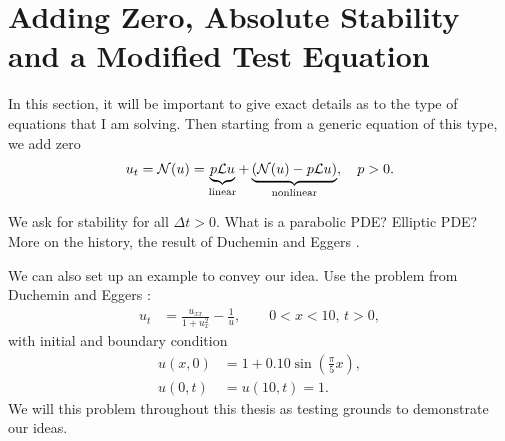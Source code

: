 \chapter{Adding Zero, Absolute Stability and a Modified Test Equation}
In this section, it will be important to give exact details as to the type of equations that I am solving. Then starting from a generic equation of this type, we add zero
\begin{align}
        u_t = \mathcal{N}(u)
= \underbrace{p\mathcal{L} u}_\text{linear} +\underbrace{ (\mathcal{N}(u) - p\mathcal{L} u)}_\text{nonlinear}, 
\quad 
p > 0.
\label{generic}
\end{align}

We ask for stability for all $\Delta t > 0$. What is a parabolic PDE? Elliptic PDE? More on the history, the result of Duchemin and Eggers \cite{duchemin2014explicit}.


We can also set up an example to convey our idea. Use the problem from Duchemin and Eggers \cite{duchemin2014explicit}: 
\begin{align*}
u_t &= \frac{u_{xx}}{1 + u_x^2} - \frac{1}{u}, 
\qquad 0 < x < 10, \, t > 0,
\end{align*}
with initial and boundary condition
\begin{align*}
u(x,0) &= 1 + 0.10\sin\left(\frac{\pi}{5} x \right),
\\
u(0,t) &= u(10,t) = 1.
\end{align*}
We will this problem throughout this thesis as testing grounds to demonstrate our ideas.